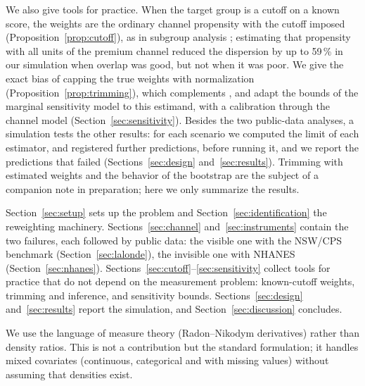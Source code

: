 \documentclass[11pt,a4paper]{article}
\theoremstyle{plain}
\theoremstyle{definition}
\begin{document}
We also give tools for practice. When the target group is a cutoff on a known score, the weights are the ordinary channel propensity with the cutoff imposed (Proposition~\ref{prop:cutoff}), as in subgroup analysis \citep{rassen2012}; estimating that propensity with all units of the premium channel reduced the dispersion by up to 59\,\% in our simulation when overlap was good, but not when it was poor. We give the exact bias of capping the true weights with normalization (Proposition~\ref{prop:trimming}), which complements \citet{ma2020}, and adapt the bounds of the marginal sensitivity model \citep{tan2006,dorn2023} to this estimand, with a calibration through the channel model (Section~\ref{sec:sensitivity}). Besides the two public-data analyses, a simulation tests the other results: for each scenario we computed the limit of each estimator, and registered further predictions, before running it, and we report the predictions that failed (Sections~\ref{sec:design} and~\ref{sec:results}). Trimming with estimated weights and the behavior of the bootstrap are the subject of a companion note in preparation; here we only summarize the results.

Section~\ref{sec:setup} sets up the problem and Section~\ref{sec:identification} the reweighting machinery. Sections~\ref{sec:channel} and~\ref{sec:instruments} contain the two failures, each followed by public data: the visible one with the NSW/CPS benchmark (Section~\ref{sec:lalonde}), the invisible one with NHANES (Section~\ref{sec:nhanes}). Sections~\ref{sec:cutoff}--\ref{sec:sensitivity} collect tools for practice that do not depend on the measurement problem: known-cutoff weights, trimming and inference, and sensitivity bounds. Sections~\ref{sec:design} and~\ref{sec:results} report the simulation, and Section~\ref{sec:discussion} concludes.

We use the language of measure theory (Radon--Nikodym derivatives) rather than density ratios. This is not a contribution but the standard formulation; it handles mixed covariates (continuous, categorical and with missing values) without assuming that densities exist.
\end{document}
